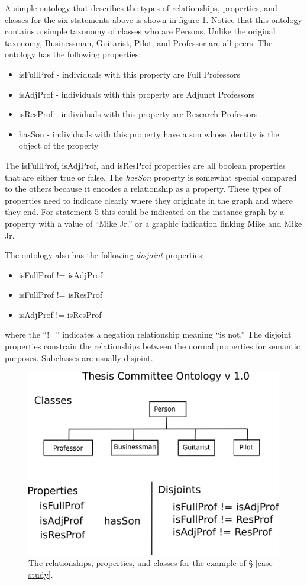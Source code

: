A simple ontology that describes the types of relationships, properties, and
classes for the six statements above is shown in figure \ref{ont-classes}.
Notice that this ontology contains a simple taxonomy of classes who are
Persons. Unlike the original taxonomy, Businessman, Guitarist, Pilot,
and Professor are all peers. The ontology has the following properties:
\begin{itemize}
  \item isFullProf - individuals with this property are Full Professors
  \item isAdjProf - individuals with this property are Adjunct Professors
  \item isResProf - individuals with this property are Research Professors
  \item hasSon - individuals with this property have a son whose identity is the
  object of the property
\end{itemize} 
The isFullProf, isAdjProf, and isResProf properties are all boolean properties
that are either true or false. The \textit{hasSon} property is somewhat special
compared to the others because it encodes a relationship as a property. These
types of properties need to indicate clearly where they originate in the graph
and where they end. For statement 5 this could be indicated on the instance
graph by a property with a value of ``Mike Jr.'' or a graphic indication linking
Mike and Mike Jr.

The ontology also has the following \textit{disjoint} properties:
\begin{itemize}
  \item isFullProf != isAdjProf
  \item isFullProf != isResProf
  \item isAdjProf != isResProf
\end{itemize}
where the ``!='' indicates a negation relationship meaning ``is not.'' The
disjoint properties constrain the relationships between the normal properties
for semantic purposes. Subclasses are usually disjoint.

\begin{figure}[htbp]
\centering
\includegraphics[width=\textwidth]{figures/tc-ont-classes.png}
\caption{The relationships, properties, and classes for the example of \S
\ref{case-study}.}
\label{ont-classes}
\end{figure}

